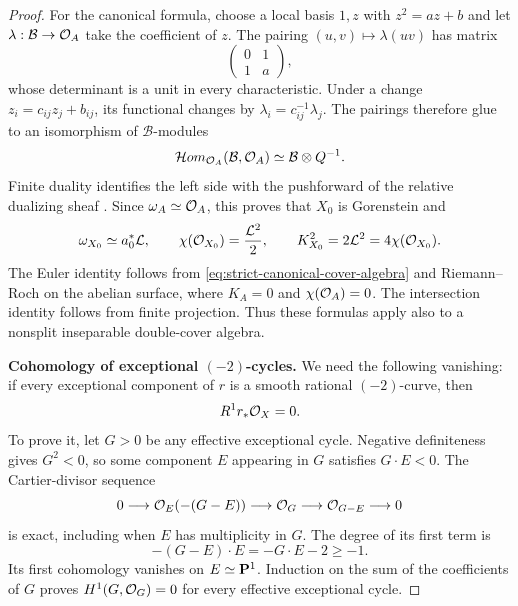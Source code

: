 \begin{proof}
For the canonical formula, choose a local basis $1,z$ with
$z^2=az+b$ and let $\lambda:\mathcal B\to\mathcal O_A$ take the
coefficient of $z$.  The pairing $(u,v)\mapsto\lambda(uv)$
has matrix
\[
 \begin{pmatrix}0&1\\1&a\end{pmatrix},
\]
whose determinant is a unit in every characteristic.
Under a change $z_i=c_{ij}z_j+b_{ij}$, its functional changes
by $\lambda_i=c_{ij}^{-1}\lambda_j$.  The pairings therefore
glue to an isomorphism of $\mathcal B$-modules
\[
 \mathcal Hom_{\mathcal O_A}(\mathcal B,\mathcal O_A)
 \simeq\mathcal B\otimes Q^{-1}.
\]
Finite duality identifies the left side with the pushforward
of the relative dualizing sheaf
\cite[Sections~49.5 and~49.15, Tags~0FKW and~0DWM]{Stacks}.
Since $\omega_A\simeq\mathcal O_A$, this proves that $X_0$ is
Gorenstein and
\begin{equation}\label{eq:strict-canonical-finite-identities}
 \omega_{X_0}\simeq a_0^*\mathcal L,\qquad
 \chi(\mathcal O_{X_0})=\frac{\mathcal L^2}{2},\qquad
 K_{X_0}^2=2\mathcal L^2=4\chi(\mathcal O_{X_0}).
\end{equation}
The Euler identity follows from
\eqref{eq:strict-canonical-cover-algebra} and Riemann--Roch on
the abelian surface, where $K_A=0$ and $\chi(\mathcal O_A)=0$.
The intersection identity follows from finite projection.
Thus these formulas apply also to a nonsplit inseparable
double-cover algebra.

\par\smallskip\noindent\textbf{Cohomology of exceptional $(-2)$-cycles.}
We need the following vanishing: if every exceptional component
of $r$ is a smooth rational $(-2)$-curve, then
\begin{equation}\label{eq:strict-canonical-cycle-vanishing}
 R^1r_*\mathcal O_X=0.
\end{equation}
To prove it, let $G>0$ be any effective exceptional cycle.
Negative definiteness gives $G^2<0$, so some component $E$
appearing in $G$ satisfies $G\cdot E<0$.
The Cartier-divisor sequence
\[
 0\longrightarrow\mathcal O_E(-(G-E))
 \longrightarrow\mathcal O_G\longrightarrow\mathcal O_{G-E}
 \longrightarrow0
\]
is exact, including when $E$ has multiplicity in $G$.
The degree of its first term is
\[
 -(G-E)\cdot E=-G\cdot E-2\ge-1.
\]
Its first cohomology vanishes on $E\simeq\mathbf P^1$.
Induction on the sum of the coefficients of $G$ proves
$H^1(G,\mathcal O_G)=0$ for every effective exceptional cycle.


\end{proof}
